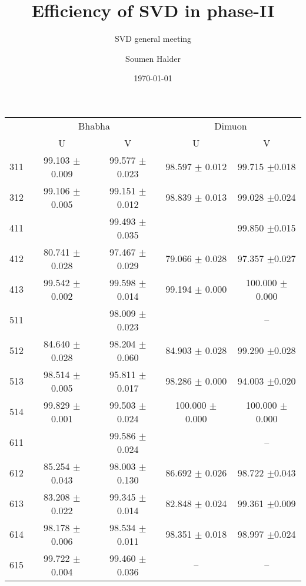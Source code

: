 \documentclass[xcolor=dvipsnames]{beamer}
\begin{document}
		\title{Efficiency of SVD in phase-II }
		   
		\author{Soumen Halder} 
		\date{\today} 
			\subtitle{ SVD general meeting }
		\frame{\titlepage}
		
		\begin{frame}
				
				\begin{center}	
					\begin{tabular}{|c|c|c| c|c|}
						\hline
					&	\multicolumn{2}{|c|}{Bhabha } &\multicolumn{2}{|c|}{Dimuon }\\
						& U &V & U& V\\
					311&   99.103 $\pm$ 0.009 &   99.577 $\pm$0.023 &         98.597  $\pm$ 0.012 &   99.715  $\pm$0.018  \\
					312&   99.106 $\pm$ 0.005 &   99.151 $\pm$0.012 &         98.839  $\pm$ 0.013 &   99.028  $\pm$0.024  \\
					
					411&                      &   99.493 $\pm$0.035 &                             &   99.850  $\pm$0.015  \\
					412&   80.741 $\pm$ 0.028 &   97.467 $\pm$0.029 &         79.066  $\pm$ 0.028 &   97.357  $\pm$0.027  \\
					413&   99.542 $\pm$ 0.002 &   99.598 $\pm$0.014 &         99.194  $\pm$ 0.000 &   100.000 $\pm$0.000  \\
					
					511&                      &   98.009 $\pm$0.023 &                             &    --         \\
					512&   84.640 $\pm$ 0.028 &   98.204 $\pm$0.060 &         84.903  $\pm$ 0.028 &   99.290  $\pm$0.028  \\
					513&   98.514 $\pm$ 0.005 &   95.811 $\pm$0.017 &         98.286  $\pm$ 0.000 &   94.003  $\pm$0.020  \\
					514&   99.829 $\pm$ 0.001 &   99.503 $\pm$0.024 &         100.000 $\pm$ 0.000 &   100.000 $\pm$0.000  \\
					
					611&                      &   99.586 $\pm$0.024 &                             &    --      \\
					612&   85.254 $\pm$ 0.043 &   98.003 $\pm$0.130 &         86.692  $\pm$ 0.026 &   98.722  $\pm$0.043  \\
					613&   83.208 $\pm$ 0.022 &   99.345 $\pm$0.014 &         82.848  $\pm$ 0.024 &   99.361  $\pm$0.009  \\
					614&   98.178 $\pm$ 0.006 &   98.534 $\pm$0.011 &         98.351  $\pm$ 0.018 &   98.997  $\pm$0.024  \\
					615&   99.722 $\pm$ 0.004 &   99.460 $\pm$0.036 &         --         &   --           \\
						
					
						\end{tabular}
						\end{center}
		\end{frame}
\end{document}
